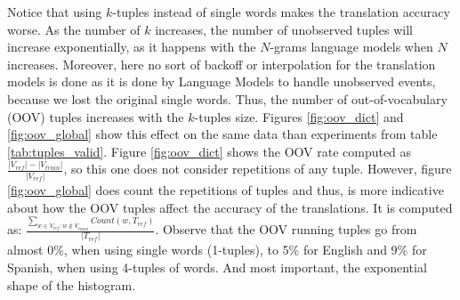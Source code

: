 \documentclass[10pt,a4paper]{article}
\begin{document}
Notice that using $k$-tuples instead of single words makes the translation accuracy worse. As the number of $k$ increases, the number of unobserved tuples will increase exponentially, as it happens with the $N$-grams language models when $N$ increases. Moreover, here no sort of backoff or interpolation for the translation models is done as it is done by Language Models to handle unobserved events, because we lost the original single words. Thus, the number of out-of-vocabulary (OOV) tuples increases with the $k$-tuples size. Figures \ref{fig:oov_dict} and \ref{fig:oov_global} show this effect on the same data than experiments from table \ref{tab:tuples_valid}. Figure \ref{fig:oov_dict} shows the OOV rate computed as $\frac{|V_{ref}| - |V_{train}|}{|V_{ref}|}$, so this one does not consider repetitions of any tuple. However, figure \ref{fig:oov_global} does count the repetitions of tuples and thus, is more indicative about how the OOV tuples affect the accuracy of the translations. It is computed as: $\frac{\sum_{w \in V_{ref} : w \notin V_{train}} Count(w, T_{ref})}{|T_{ref}|}$. Observe that the OOV running tuples go from almost 0\%, when using single words (1-tuples), to 5\% for English and 9\% for Spanish, when using 4-tuples of words. And most important, the exponential shape of the histogram.\\
\end{document}

